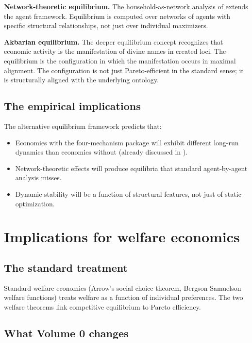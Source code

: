 \textbf{Network-theoretic equilibrium.} The household-as-network
analysis of  extends the agent
framework. Equilibrium is computed over networks of agents with
specific structural relationships, not just over individual
maximizers.

\textbf{Akbarian equilibrium.} The deeper equilibrium concept
recognizes that economic activity is the manifestation of divine
names in created loci. The equilibrium is the configuration in
which the manifestation occurs in maximal alignment. The
configuration is not just Pareto-efficient in the standard
sense; it is structurally aligned with the underlying ontology.

\subsection{The empirical implications}

The alternative equilibrium framework predicts that:

\begin{itemize}[leftmargin=2em]
    \item Economies with the four-mechanism package will exhibit
    different long-run dynamics than economies without (already
    discussed in ).
    \item Network-theoretic effects will produce equilibria that
    standard agent-by-agent analysis misses.
    \item Dynamic stability will be a function of structural
    features, not just of static optimization.
\end{itemize}

\section{Implications for welfare economics}
\label{sec:to-vol1-welfare}

\subsection{The standard treatment}

Standard welfare economics (Arrow's social choice theorem,
Bergson-Samuelson welfare functions) treats welfare as a function
of individual preferences. The two welfare theorems link
competitive equilibrium to Pareto efficiency.

\subsection{What Volume 0 changes}

